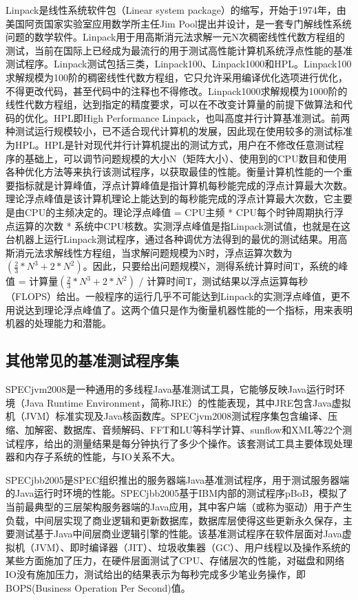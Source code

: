 \documentclass[]{ctexbook}
\begin{document}
Linpack是线性系统软件包（Linear system package）的缩写，开始于1974年，由美国阿贡国家实验室应用数学所主任Jim Pool提出并设计，是一套专门解线性系统问题的数学软件。Linpack用于用高斯消元法求解一元N次稠密线性代数方程组的测试，当前在国际上已经成为最流行的用于测试高性能计算机系统浮点性能的基准测试程序。Linpack测试包括三类，Linpack100、Linpack1000和HPL。Linpack100求解规模为100阶的稠密线性代数方程组，它只允许采用编译优化选项进行优化，不得更改代码，甚至代码中的注释也不得修改。Linpack1000求解规模为1000阶的线性代数方程组，达到指定的精度要求，可以在不改变计算量的前提下做算法和代码的优化。HPL即High Performance Linpack，也叫高度并行计算基准测试。前两种测试运行规模较小，已不适合现代计算机的发展，因此现在使用较多的测试标准为HPL。HPL是针对现代并行计算机提出的测试方式，用户在不修改任意测试程序的基础上，可以调节问题规模的大小N（矩阵大小）、使用到的CPU数目和使用各种优化方法等来执行该测试程序，以获取最佳的性能。衡量计算机性能的一个重要指标就是计算峰值，浮点计算峰值是指计算机每秒能完成的浮点计算最大次数。理论浮点峰值是该计算机理论上能达到的每秒能完成的浮点计算最大次数，它主要是由CPU的主频决定的。理论浮点峰值 = CPU主频 * CPU每个时钟周期执行浮点运算的次数 * 系统中CPU核数。实测浮点峰值是指Linpack测试值，也就是在这台机器上运行Linpack测试程序，通过各种调优方法得到的最优的测试结果。用高斯消元法求解线性方程组，当求解问题规模为N时，浮点运算次数为\((\frac{2}{3} * N^{3} + 2 * N^{2})\)。因此，只要给出问题规模N，测得系统计算时间T，系统的峰值 = 计算量\((\frac{2}{3} * N^{3} + 2 * N^{2})\) / 计算时间T，测试结果以浮点运算每秒（FLOPS）给出。一般程序的运行几乎不可能达到Linpack的实测浮点峰值，更不用说达到理论浮点峰值了。这两个值只是作为衡量机器性能的一个指标，用来表明机器的处理能力和潜能。

\hypertarget{ux5176ux4ed6ux5e38ux89c1ux7684ux57faux51c6ux6d4bux8bd5ux7a0bux5e8fux96c6}{%
\subsection{其他常见的基准测试程序集}\label{ux5176ux4ed6ux5e38ux89c1ux7684ux57faux51c6ux6d4bux8bd5ux7a0bux5e8fux96c6}}

SPECjvm2008是一种通用的多线程Java基准测试工具，它能够反映Java运行时环境（Java Runtime Environment，简称JRE）的性能表现，其中JRE包含Java虚拟机（JVM）标准实现及Java核函数库。SPECjvm2008测试程序集包含编译、压缩、加解密、数据库、音频解码、FFT和LU等科学计算、sunflow和XML等22个测试程序，给出的测量结果是每分钟执行了多少个操作。该套测试工具主要体现处理器和内存子系统的性能，与IO关系不大。

SPECjbb2005是SPEC组织推出的服务器端Java基准测试程序，用于测试服务器端的Java运行时环境的性能。SPECjbb2005基于IBM内部的测试程序pBoB，模拟了当前最典型的三层架构服务器端的Java应用，其中客户端（或称为驱动）用于产生负载，中间层实现了商业逻辑和更新数据库，数据库层使得这些更新永久保存，主要测试基于Java中间层商业逻辑引擎的性能。该基准测试程序在软件层面对Java虚拟机（JVM）、即时编译器（JIT）、垃圾收集器（GC）、用户线程以及操作系统的某些方面施加了压力，在硬件层面测试了CPU、存储层次的性能，对磁盘和网络IO没有施加压力，测试给出的结果表示为每秒完成多少笔业务操作，即BOPS(Business Operation Per Second)值。
\end{document}
